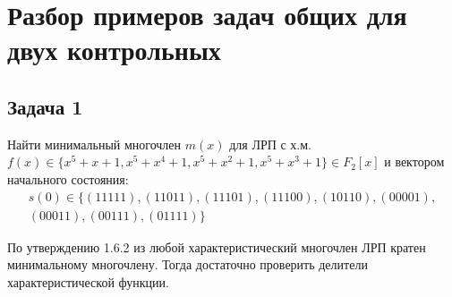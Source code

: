 \documentclass[utf8x, 14pt]{G7-32} %
\begin{document}
\section{Разбор примеров задач общих для двух контрольных}
\subsection{Задача 1} \label{prob1}


Найти минимальный многочлен $m(x)$ для ЛРП с х.м. $f(x)\in\{ x^5+x+1, x^5+x^4+1, x^5+x^2+1, x^5+x^3+1\}\in F_2[x]$ и вектором начального состояния: $$\begin{aligned}s(0)\in\{(11111), (11011), (11101), (11100), (10110), (00001), \\ (00011), (00111), (01111)\}\end{aligned}$$

По утверждению 1.6.2 из \cite{hse:Teoria_Gener} любой характеристический многочлен ЛРП кратен минимальному многочлену. Тогда достаточно проверить делители характеристической функции.
\end{document}
